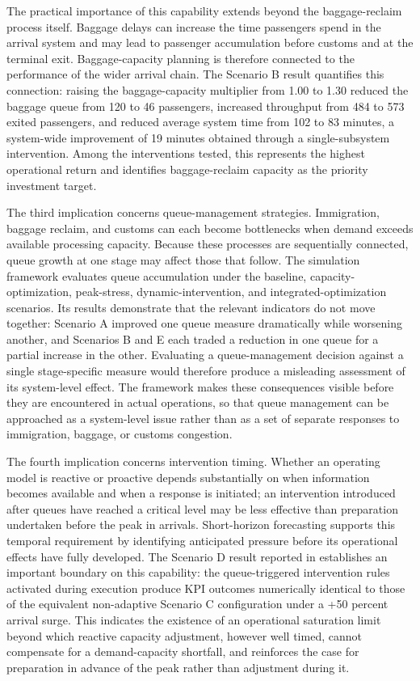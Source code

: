 The practical importance of this capability extends beyond the baggage-reclaim process itself. Baggage delays can increase the time passengers spend in the arrival system and may lead to passenger accumulation before customs and at the terminal exit. Baggage-capacity planning is therefore connected to the performance of the wider arrival chain. The Scenario B result quantifies this connection: raising the baggage-capacity multiplier from 1.00 to 1.30 reduced the baggage queue from 120 to 46 passengers, increased throughput from 484 to 573 exited passengers, and reduced average system time from 102 to 83 minutes, a system-wide improvement of 19 minutes obtained through a single-subsystem intervention. Among the interventions tested, this represents the highest operational return and identifies baggage-reclaim capacity as the priority investment target.

The third implication concerns queue-management strategies. Immigration, baggage reclaim, and customs can each become bottlenecks when demand exceeds available processing capacity. Because these processes are sequentially connected, queue growth at one stage may affect those that follow. The simulation framework evaluates queue accumulation under the baseline, capacity-optimization, peak-stress, dynamic-intervention, and integrated-optimization scenarios. Its results demonstrate that the relevant indicators do not move together: Scenario A improved one queue measure dramatically while worsening another, and Scenarios B and E each traded a reduction in one queue for a partial increase in the other. Evaluating a queue-management decision against a single stage-specific measure would therefore produce a misleading assessment of its system-level effect. The framework makes these consequences visible before they are encountered in actual operations, so that queue management can be approached as a system-level issue rather than as a set of separate responses to immigration, baggage, or customs congestion.

The fourth implication concerns intervention timing. Whether an operating model is reactive or proactive depends substantially on when information becomes available and when a response is initiated; an intervention introduced after queues have reached a critical level may be less effective than preparation undertaken before the peak in arrivals. Short-horizon forecasting supports this temporal requirement by identifying anticipated pressure before its operational effects have fully developed. The Scenario D result reported in  establishes an important boundary on this capability: the queue-triggered intervention rules activated during execution produce KPI outcomes numerically identical to those of the equivalent non-adaptive Scenario C configuration under a +50 percent arrival surge. This indicates the existence of an operational saturation limit beyond which reactive capacity adjustment, however well timed, cannot compensate for a demand-capacity shortfall, and reinforces the case for preparation in advance of the peak rather than adjustment during it.

